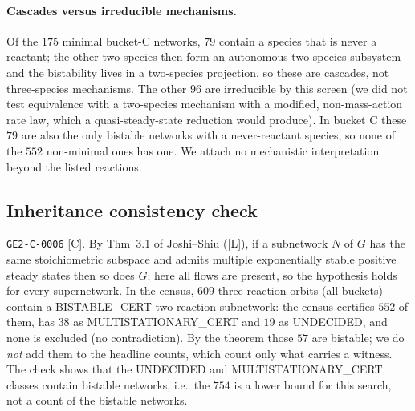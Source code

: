 \documentclass[11pt]{article}
\newcommand{\tier}[1]{\textsf{[#1]}}
\newcommand{\tL}{\tier{L}}
\newcommand{\tC}{\tier{C}}
\begin{document}
\begin{table}[h]\centering\scriptsize
\resizebox{\linewidth}{!}{}
\caption{The nine bistable networks with two internal reactions (up to relabelling), with the two stable positive equilibria of one exact witness each. All parameters are positive rationals given in full in \texttt{data/witnesses/<id>.json}; every other species flow is as in Section~\ref{sec:class}. All nine are irreducible in our screen: every species is a reactant somewhere and no equation decouples. This was not checked against the literature.}\label{tab:two}
\end{table}

\paragraph{Cascades versus irreducible mechanisms.} Of the $175$ minimal bucket-C networks, $79$ contain a species that is never a reactant; the other two species then form an autonomous two-species subsystem and the bistability lives in a two-species projection, so these are cascades, not three-species mechanisms. The other $96$ are irreducible by this screen (we did not test equivalence with a two-species mechanism with a modified, non-mass-action rate law, which a quasi-steady-state reduction would produce). In bucket C these $79$ are also the only bistable networks with a never-reactant species, so none of the $552$ non-minimal ones has one. We attach no mechanistic interpretation beyond the listed reactions.

\subsection{Inheritance consistency check}\label{sec:inherit}
\texttt{GE2-C-0006} \tC{}. By Thm~3.1 of Joshi--Shiu \cite{atoms} (\tL{}), if a subnetwork $N$ of $G$ has the same stoichiometric subspace and admits multiple exponentially stable positive steady states then so does $G$; here all flows are present, so the hypothesis holds for every supernetwork. In the census, $609$ three-reaction orbits (all buckets) contain a BISTABLE\_CERT two-reaction subnetwork: the census certifies $552$ of them, has $38$ as MULTISTATIONARY\_CERT and $19$ as UNDECIDED, and none is excluded (no contradiction). By the theorem those $57$ are bistable; we do \emph{not} add them to the headline counts, which count only what carries a witness. The check shows that the UNDECIDED and MULTISTATIONARY\_CERT classes contain bistable networks, i.e.\ the $754$ is a lower bound for this search, not a count of the bistable networks.
\end{document}
